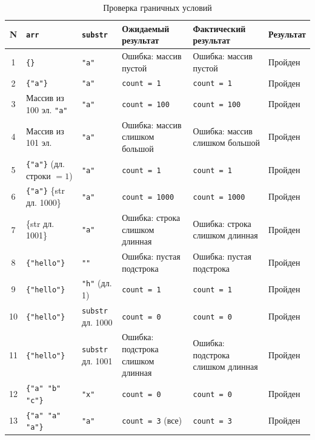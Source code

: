 \documentclass{article}[14pt]
\begin{document}
\begin{table}[H]
\centering
\caption{Проверка граничных условий}
\begin{tabular}{|c|p{3.5cm}|p{2.5cm}|p{3cm}|p{3cm}|p{1.5cm}|}
\hline
\textbf{N} & \textbf{\texttt{arr}} & \textbf{\texttt{substr}} & \textbf{Ожидаемый результат} & \textbf{Фактический результат} & \textbf{Результат} \\
\hline
1 &
    \texttt{\{\}} &
    \texttt{"a"} &
    Ошибка: массив пустой &
    Ошибка: массив пустой &
    Пройден \\
\hline
2 &
    \texttt{\{"a"\}} &
    \texttt{"a"} &
    \texttt{count = 1} &
    \texttt{count = 1} &
    Пройден \\
\hline
3 &
    Массив из 100 эл. \texttt{"a"} &
    \texttt{"a"} &
    \texttt{count = 100} &
    \texttt{count = 100} &
    Пройден \\
\hline
4 &
    Массив из 101 эл. &
    \texttt{"a"} &
    Ошибка: массив слишком большой &
    Ошибка: массив слишком большой &
    Пройден \\
\hline
5 &
    \texttt{\{"a"\}} (дл. строки $= 1$) &
    \texttt{"a"} &
    \texttt{count = 1} &
    \texttt{count = 1} &
    Пройден \\
\hline
6 &
    \texttt{\{"a"\}} \{str дл. 1000\} &
    \texttt{"a"} &
    \texttt{count = 1000} &
    \texttt{count = 1000} &
    Пройден \\
\hline
7 &
    \{str дл. 1001\} &
    \texttt{"a"} &
    Ошибка: строка слишком длинная &
    Ошибка: строка слишком длинная &
    Пройден \\
\hline
8 &
    \texttt{\{"hello"\}} &
    \texttt{""} &
    Ошибка: пустая подстрока &
    Ошибка: пустая подстрока &
    Пройден \\
\hline
9 &
    \texttt{\{"hello"\}} &
    \texttt{"h"} (дл. 1) &
    \texttt{count = 1} &
    \texttt{count = 1} &
    Пройден \\
\hline
10 &
    \texttt{\{"hello"\}} &
    \texttt{substr} дл. 1000 &
    \texttt{count = 0} &
    \texttt{count = 0} &
    Пройден \\
\hline
11 &
    \texttt{\{"hello"\}} &
    \texttt{substr} дл. 1001 &
    Ошибка: подстрока слишком длинная &
    Ошибка: подстрока слишком длинная &
    Пройден \\
\hline
12 &
    \texttt{\{"a" "b" "c"\}} &
    \texttt{"x"} &
    \texttt{count = 0} &
    \texttt{count = 0} &
    Пройден \\
\hline
13 &
    \texttt{\{"a" "a" "a"\}} &
    \texttt{"a"} &
    \texttt{count = 3} (все) &
    \texttt{count = 3} &
    Пройден \\
\hline
\end{tabular}
\end{table}
\end{document}
